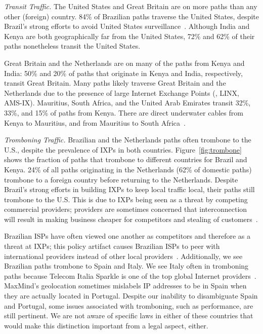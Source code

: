 {\it Transit Traffic.} The United States and Great Britain are on more paths than any 
other (foreign) country.  84\% of Brazilian paths traverse the United States, despite Brazil's
strong efforts to avoid United States surveillance~\cite{brazil_break_from_US,brazil_us_companies,brazil_conference,brazil_conference2,brazil_human_rights,brazil_cable}.  Although India and
Kenya are both geographically far from the United States, 72\% and 62\% of their
paths nonetheless transit the United States.

Great Britain and the Netherlands are on 
many of the paths from Kenya and India:
50\% and 20\% of
paths that originate in Kenya and India, respectively, transit Great
Britain.   Many paths likely traverse Great Britain and the Netherlands due to
the presence of large Internet Exchange Points (\ie, LINX, AMS-IX).
Mauritius, South Africa, and the United Arab Emirates transit 32\%,
33\%, and 15\% of paths from Kenya.  There are direct underwater cables
from Kenya to Mauritius, and from Mauritius to South
Africa~\cite{cablemap}.

{\it Tromboning Traffic.}
Brazilian and the Netherlands paths often trombone to the U.S., despite the 
prevalence of IXPs in both countries. Figure~\ref{fig:trombone}
shows the fraction of paths that trombone to
different countries for Brazil and Kenya. 24\% of
all paths originating in the Netherlands (62\% of domestic paths)
trombone to a foreign country before returning to the
Netherlands. Despite Brazil's strong efforts in building IXPs to keep
local traffic local, 
their paths still trombone to the U.S.  This is due to IXPs being seen
as a threat by competing commercial providers; providers are sometimes
concerned that interconnection will result in making business
cheaper for competitors and stealing of customers~\cite{ixp_policy}.

Brazilian ISPs have often viewed one another as competitors and therefore as a
threat at IXPs; this policy artifact causes Brazilian ISPs to peer with international
providers instead
of other local providers~\cite{ixp_policy}.  Additionally, we see Brazilian paths trombone to
Spain and Italy.  We see Italy often in tromboning paths because Telecom
Italia Sparkle is one of the top global Internet providers~\cite{bakers}. 
MaxMind's geolocation sometimes mislabels IP addresses to be in
Spain when they are actually located in Portugal.  Despite our inability to
disambiguate Spain and Portugal, some issues associated with tromboning,
such as performance, are still pertinent. We are not aware of specific laws in
either of these countries that would make this distinction important from a legal aspect, either.

